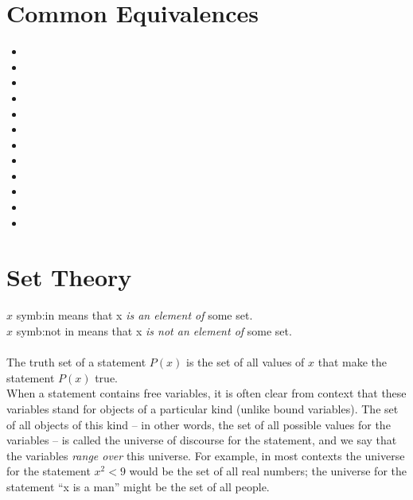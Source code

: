 \documentclass{article}
\begin{document}
\section{Common Equivalences}
\begin{itemize}
	\item {}
	\item {}
	\item {}
	\item {}
    \item {}
    \item {}
    \item {}
    \item {}
    \item {}
    \item {}
    \item {}
    \item {}
\end{itemize}

\section{Set Theory}
\noindent $x$ \gls{symb:in} means that x \textit{is an element of} some set.\\
\noindent $x$ \gls{symb:not in} means that x \textit{is not an element of} some set.\\\\
The \gls{truth set} of a statement $P(x)$ is the set of all values of $x$ that make the statement $P(x)$ true.\\
When a statement contains \glspl{free variable}, it is often clear from context that these variables stand for objects of a particular kind (unlike \glspl{bound variable}). The set of all objects of this kind – in other words, the set of all possible values for the variables – is called the \gls{universe of discourse} for the statement, and we say that the variables \textit{range over} this universe. For example, in most contexts the universe for the statement $x^2 < 9$ would be the set of all real numbers; the universe for the statement “x is a man” might be the set of all people.
\end{document}
